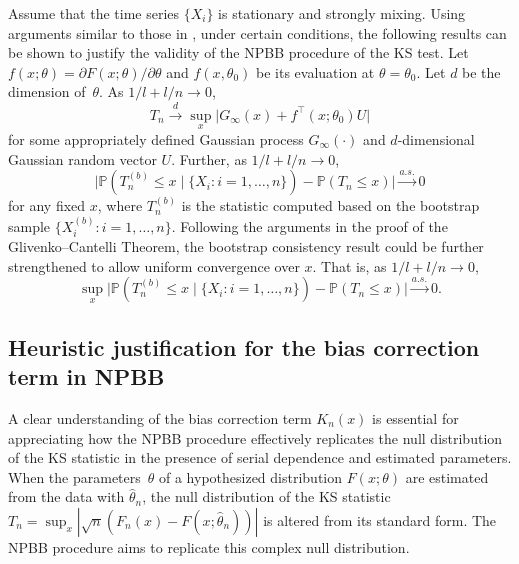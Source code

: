 \documentclass[12pt]{article}
\begin{document}
Assume that the time series $\{X_i\}$ is stationary and
strongly mixing. Using arguments similar to those
in \citet{kunsch1989jackknife}, under certain conditions, the
following results can be shown to
justify the validity of the NPBB procedure of the KS test.
Let $f(x; \theta) = {\partial F(x; \theta)} / {\partial \theta}$
and $f(x, \theta_0)$ be its evaluation at $\theta = \theta_0$.
Let $d$ be the  dimension of~$\theta$.
As $1/l+l/n\rightarrow 0$,
\[
  T_n \overset{d}{\rightarrow}
  \sup_x \big\vert G_{\infty}(x)+f^\top (x;\theta_0)U \big\vert
\]
for some appropriately defined Gaussian process $G_{\infty}(\cdot)$
and $d$-dimensional Gaussian random vector $U$.
Further,  as $1/l+l/n\rightarrow 0$,
\[
  \big\vert \mathbb{P}(T_n^{(b)}\leq x \mid \{X_i: i = 1, \ldots, n\}) -
  \mathbb{P}(T_n\leq x) \big\vert
  \overset{a.s.}{\rightarrow} 0
\]
for any fixed $x$, where $T_n^{(b)}$ is the statistic computed
based on the bootstrap sample $\{X_i^{(b)}: i = 1, \ldots, n\}$.
Following the arguments in the proof of the Glivenko--Cantelli
Theorem, the bootstrap consistency result could be further
strengthened to allow uniform convergence over $x$. That is,
as $1/l+l/n\rightarrow 0$,
\[
  \sup_x \big \vert
  \mathbb{P}(T_n^{(b)}\leq x \mid \{X_i: i = 1, \ldots, n\}) - \mathbb{P}(T_n\leq x) \big\vert
  \overset{a.s.}{\rightarrow} 0.
\]

\subsection{Heuristic justification for the bias correction term in NPBB}

A clear understanding of the bias correction term $K_n(x)$ is 
essential for appreciating how the NPBB procedure effectively replicates 
the null distribution of the KS statistic in the presence of serial 
dependence and estimated parameters. When the parameters~$\theta$ of a
hypothesized distribution $F(x;\theta)$ are estimated from
the data with $\hat\theta_n$, the null distribution of the KS statistic 
$T_n = \sup_x |\sqrt{n}(F_n(x) - F(x;\hat\theta_n))|$ is altered from its 
standard form. The NPBB procedure aims to replicate this complex null 
distribution.
\end{document}
